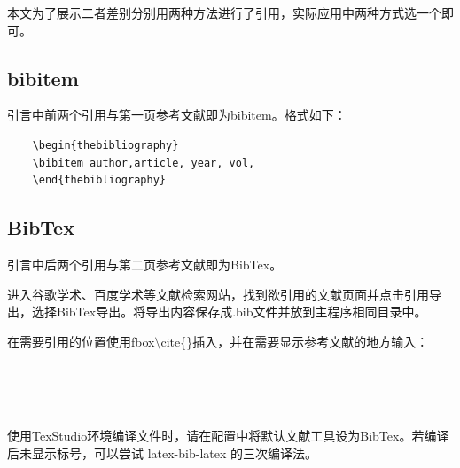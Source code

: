 \begin{spacing}{1.5}
	本文为了展示二者差别分别用两种方法进行了引用，实际应用中两种方式选一个即可。
	
	\subsection{bibitem}
	引言中前两个引用与第一页参考文献即为bibitem。格式如下：
	\begin{lstlisting}
	\begin{thebibliography}
	\bibitem author,article, year, vol,
	\end{thebibliography}
	\end{lstlisting}
	\subsection{BibTex}
	引言中后两个引用与第二页参考文献即为BibTex。
	
	进入谷歌学术、百度学术等文献检索网站，找到欲引用的文献页面并点击引用导出，选择BibTex导出。将导出内容保存成.bib文件并放到主程序相同目录中。
	
	在需要引用的位置使用fbox{$\setminus$cite\{\}}插入，并在需要显示参考文献的地方输入：
	
	\begin{lstlisting}
	
	
	
	\end{lstlisting}
	
	使用TexStudio环境编译文件时，请在配置中将默认文献工具设为BibTex。若编译后未显示标号，可以尝试 latex-bib-latex 的三次编译法。
	
\end{spacing}